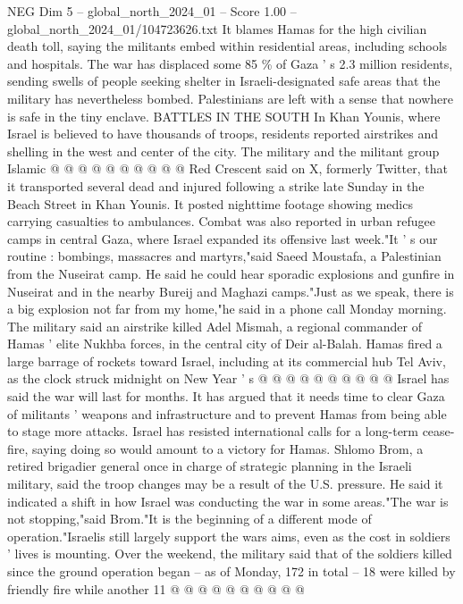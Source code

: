 \begin{textsample}{NEG Dim 5 – global\_north\_2024\_01 – Score 1.00 – global\_north\_2024\_01/104723626.txt}
It blames Hamas for the high civilian death toll, saying the militants embed within residential areas, including schools and hospitals.
The war has displaced some 85 \% of Gaza ' s 2.3 million residents, sending swells of people seeking shelter in Israeli-designated safe areas that the military has nevertheless bombed.
Palestinians are left with a sense that nowhere is safe in the tiny enclave.
BATTLES IN THE SOUTH In Khan Younis, where Israel is believed to have thousands of troops, residents reported airstrikes and shelling in the west and center of the city.
The military and the militant group Islamic @ @ @ @ @ @ @ @ @ @ Red Crescent said on X, formerly Twitter, that it transported several dead and injured following a strike late Sunday in the Beach Street in Khan Younis.
It posted nighttime footage showing medics carrying casualties to ambulances.
Combat was also reported in urban refugee camps in central Gaza, where Israel expanded its offensive last week."It ' s our routine : bombings, massacres and martyrs,"said Saeed Moustafa, a Palestinian from the Nuseirat camp.
He said he could hear sporadic explosions and gunfire in Nuseirat and in the nearby Bureij and Maghazi camps."Just as we speak, there is a big explosion not far from my home,"he said in a phone call Monday morning.
The military said an airstrike killed Adel Mismah, a regional commander of Hamas ' elite Nukhba forces, in the central city of Deir al-Balah.
Hamas fired a large barrage of rockets toward Israel, including at its commercial hub Tel Aviv, as the clock struck midnight on New Year ' s @ @ @ @ @ @ @ @ @ @ Israel has said the war will last for months.
It has argued that it needs time to clear Gaza of militants ' weapons and infrastructure and to prevent Hamas from being able to stage more attacks.
Israel has resisted international calls for a long-term cease-fire, saying doing so would amount to a victory for Hamas.
Shlomo Brom, a retired brigadier general once in charge of strategic planning in the Israeli military, said the troop changes may be a result of the U.S. pressure.
He said it indicated a shift in how Israel was conducting the war in some areas."The war is not stopping,"said Brom."It is the beginning of a different mode of operation."Israelis still largely support the wars aims, even as the cost in soldiers ' lives is mounting.
Over the weekend, the military said that of the soldiers killed since the ground operation began -- as of Monday, 172 in total -- 18 were killed by friendly fire while another 11 @ @ @ @ @ @ @ @ @ @

\end{textsample}
